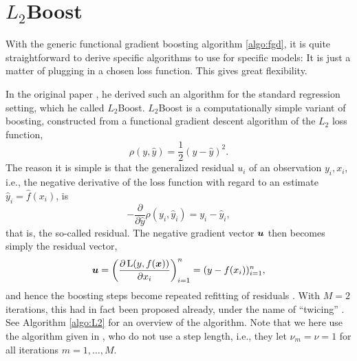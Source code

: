 
\section{$L_2$Boost}
With the generic functional gradient boosting algorithm \eqref{algo:fgd}, it is quite straightforward to derive specific algorithms to use for specific models: It is just a matter of plugging in a chosen loss function. This gives great flexibility.

In the original paper \citep{friedman2001}, he derived such an algorithm for the standard regression setting, which he called $L_2$Boost. $L_2$Boost is a computationally simple variant of boosting, constructed from a functional gradient descent algorithm of the $L_2$ loss function,
\begin{equation*}
    \rho(y, \hat{y})=\frac{1}{2}(y-\hat{y})^2.
\end{equation*}
The reason it is simple is that the generalized residual $u_i$ of an observation $y_i,x_i$, i.e., the negative derivative of the loss function with regard to an estimate $\hat{y}_i=\hat{f}(x_i)$, is
\begin{equation*}
    -\frac{\partial}{\partial\hat{y}}\rho(y_i, \hat{y}_i)=y_i-\hat{y}_i,
\end{equation*}
that is, the so-called residual. The negative gradient vector $\bm{u}$ then becomes simply the residual vector,
\begin{equation*}
    \bm{u}=\left(\frac{\partial\operatorname{L}(y,f(\bm{x}))}{\partial x_i}\right)_{i=1}^n=(y-f(x_i))_{i=1}^n,
\end{equation*}
and hence the boosting steps become repeated refitting of residuals \citep{friedman2001,buhlmann-yu}. With $M=2$ iterations, this had in fact been proposed already, under the name of ``twicing'' \citep{tukey}. See Algorithm \ref{algo:L2} for an overview of the algorithm. Note that we here use the algorithm given in \citet{buhlmann-yu}, who do not use a step length, i.e., they let $\nu_m=\nu=1$ for all iterations $m=1,\ldots,M$.
